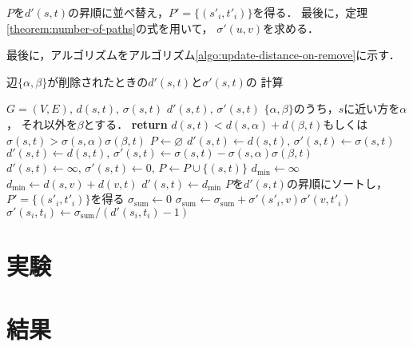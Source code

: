 $P$を$d'(s,t)$の昇順に並べ替え，$P'=\{(s'_i,t'_i)\}$を得る．
最後に，定理\ref{theorem:number-of-paths}の式を用いて，
$\sigma'(u,v)$を求める．

最後に，アルゴリズムをアルゴリズム\ref{algo:update-distance-on-remove}に示す．
\begin{algorithm}
  \caption{辺$\{\alpha,\beta\}$が削除されたときの$d'(s,t)$と$\sigma'(s,t)$の
  計算}\label{algo:update-distance-on-remove}
  \begin{algorithmic}[1]
    \Require $G=(V,E),\,d(s,t),\,\sigma(s,t)$
    \Ensure $d'(s,t),\,\sigma'(s,t)$
    \State $\{\alpha,\beta\}$のうち，$s$に近い方を$\alpha$，
    それ以外を$\beta$とする．
    \State \textbf{return} $d(s,t)<d(s,\alpha)+d(\beta,t)$もしくは
    $\sigma(s,t)>\sigma(s,\alpha)\sigma(\beta,t)$
    \EndProcedure
    \State $P\gets\varnothing$
    \State $d'(s,t)\gets d(s,t),\,\sigma'(s,t)\gets\sigma(s,t)$
    \State $d'(s,t)\gets d(s,t),\,\sigma'(s,t)\gets\sigma(s,t)
    -\sigma(s,\alpha)\sigma(\beta,t)$
    \Else{}
    \State $d'(s,t)\gets\infty,\,\sigma'(s,t)\gets0,\,P\gets P\cup\{(s,t)\}$
    \EndIf
    \EndFor
    \State $d_{\min}\gets\infty$
    \State $d_{\min}\gets d(s,v)+d(v,t)$
    \EndIf
    \EndIf
    \EndFor
    \State $d'(s,t)\gets d_{\min}$
    \EndFor
    \State $P$を$d'(s,t)$の昇順にソートし，$P'=\{(s'_i,t'_i)\}$を得る
    \State $\sigma_{\mathrm{sum}}\gets0$
    \State $\sigma_{\mathrm{sum}}\gets
    \sigma_{\mathrm{sum}}+\sigma'(s'_i,v)\sigma'(v,t'_i)$
    \EndIf
    \EndFor
    \State $\sigma'(s_i,t_i)\gets\sigma_{\mathrm{sum}}/(d'(s_i,t_i)-1)$
    \EndFor
    \EndProcedure
  \end{algorithmic}
\end{algorithm}

\section{実験}

\section{結果}

